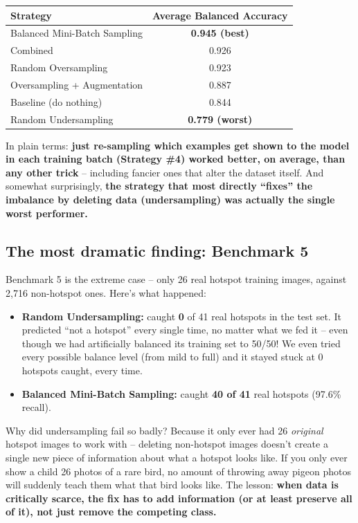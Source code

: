 \documentclass[11pt]{article}
\begin{document}
\begin{center}
\begin{tabular}{lc}
\toprule
Strategy & Average Balanced Accuracy \\
\midrule
Balanced Mini-Batch Sampling & \textbf{0.945 (best)} \\
Combined & 0.926 \\
Random Oversampling & 0.923 \\
Oversampling + Augmentation & 0.887 \\
Baseline (do nothing) & 0.844 \\
Random Undersampling & \textbf{0.779 (worst)} \\
\bottomrule
\end{tabular}
\end{center}

In plain terms: \textbf{just re-sampling which examples get shown to
the model in each training batch (Strategy \#4) worked better, on
average, than any other trick} -- including fancier ones that alter
the dataset itself. And somewhat surprisingly, \textbf{the strategy
that most directly ``fixes'' the imbalance by deleting data
(undersampling) was actually the single worst performer.}

\subsection{The most dramatic finding: Benchmark 5}
Benchmark 5 is the extreme case -- only 26 real hotspot training
images, against 2,716 non-hotspot ones. Here's what happened:

\begin{itemize}[leftmargin=1.2em]
    \item \textbf{Random Undersampling:} caught \textbf{0} of 41 real
    hotspots in the test set. It predicted ``not a hotspot'' every
    single time, no matter what we fed it -- even though we had
    artificially balanced its training set to 50/50! We even tried
    every possible balance level (from mild to full) and it stayed
    stuck at 0 hotspots caught, every time.
    \item \textbf{Balanced Mini-Batch Sampling:} caught \textbf{40 of
    41} real hotspots (97.6\% recall).
\end{itemize}

\begin{takeaway}
Why did undersampling fail so badly? Because it only ever had 26
\emph{original} hotspot images to work with -- deleting non-hotspot
images doesn't create a single new piece of information about what a
hotspot looks like. If you only ever show a child 26 photos of a rare
bird, no amount of throwing away pigeon photos will suddenly teach
them what that bird looks like. The lesson: \textbf{when data is
critically scarce, the fix has to add information (or at least
preserve all of it), not just remove the competing class.}
\end{takeaway}
\end{document}
